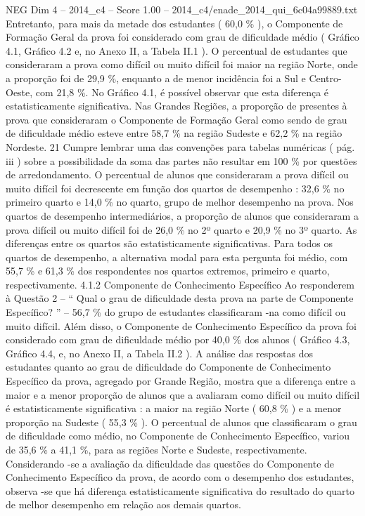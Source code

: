 \begin{textsample}{NEG Dim 4 – 2014\_c4 – Score 1.00 – 2014\_c4/enade\_2014\_qui\_6c04a99889.txt}
Entretanto, para mais da metade dos estudantes ( 60,0 \% ), o Componente de Formação Geral da prova foi considerado com grau de dificuldade médio ( Gráfico 4.1, Gráfico 4.2 e, no Anexo II, a Tabela II.1 ).
O percentual de estudantes que consideraram a prova como difícil ou muito difícil foi maior na região Norte, onde a proporção foi de 29,9 \%, enquanto a de menor incidência foi a Sul e Centro-Oeste, com 21,8 \%.
No Gráfico 4.1, é possível observar que esta diferença é estatisticamente significativa.
Nas Grandes Regiões, a proporção de presentes à prova que consideraram o Componente de Formação Geral como sendo de grau de dificuldade médio esteve entre 58,7 \% na região Sudeste e 62,2 \% na região Nordeste. 21 Cumpre lembrar uma das convenções para tabelas numéricas ( pág. iii ) sobre a possibilidade da soma das partes não resultar em 100 \% por questões de arredondamento.
O percentual de alunos que consideraram a prova difícil ou muito difícil foi decrescente em função dos quartos de desempenho : 32,6 \% no primeiro quarto e 14,0 \% no quarto, grupo de melhor desempenho na prova.
Nos quartos de desempenho intermediários, a proporção de alunos que consideraram a prova difícil ou muito difícil foi de 26,0 \% no 2º quarto e 20,9 \% no 3º quarto.
As diferenças entre os quartos são estatisticamente significativas.
Para todos os quartos de desempenho, a alternativa modal para esta pergunta foi médio, com 55,7 \% e 61,3 \% dos respondentes nos quartos extremos, primeiro e quarto, respectivamente. 4.1.2 Componente de Conhecimento Específico Ao responderem à Questão 2 – “ Qual o grau de dificuldade desta prova na parte de Componente Específico? ” – 56,7 \% do grupo de estudantes classificaram -na como difícil ou muito difícil.
Além disso, o Componente de Conhecimento Específico da prova foi considerado com grau de dificuldade médio por 40,0 \% dos alunos ( Gráfico 4.3, Gráfico 4.4, e, no Anexo II, a Tabela II.2 ).
A análise das respostas dos estudantes quanto ao grau de dificuldade do Componente de Conhecimento Específico da prova, agregado por Grande Região, mostra que a diferença entre a maior e a menor proporção de alunos que a avaliaram como difícil ou muito difícil é estatisticamente significativa : a maior na região Norte ( 60,8 \% ) e a menor proporção na Sudeste ( 55,3 \% ).
O percentual de alunos que classificaram o grau de dificuldade como médio, no Componente de Conhecimento Específico, variou de 35,6 \% a 41,1 \%, para as regiões Norte e Sudeste, respectivamente.
Considerando -se a avaliação da dificuldade das questões do Componente de Conhecimento Específico da prova, de acordo com o desempenho dos estudantes, observa -se que há diferença estatisticamente significativa do resultado do quarto de melhor desempenho em relação aos demais quartos.

\end{textsample}
